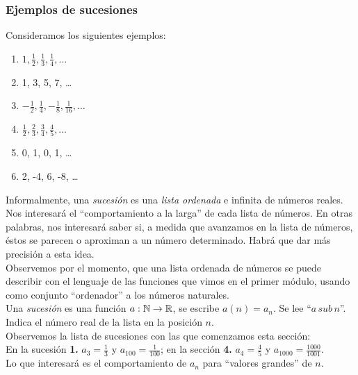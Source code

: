 \documentclass[../Teoría.root.tex]{subfiles}
\begin{document}
    \subsubsection{Ejemplos de sucesiones}
    Consideramos los siguientes ejemplos:
    \begin{enumerate}
        \item \(1,\frac{1}{2},\frac{1}{3},\frac{1}{4},\dots\)
        \item 1, 3, 5, 7, \dots
        \item \(-\frac{1}{2},\frac{1}{4},-\frac{1}{8},\frac{1}{16},\dots\)
        \item \(\frac{1}{2},\frac{2}{3},\frac{3}{4},\frac{4}{5},\dots\)
        \item 0, 1, 0, 1, \dots
        \item 2, -4, 6, -8, \dots
    \end{enumerate}
    Informalmente, una \textit{sucesión} es una \textit{lista ordenada} e infinita de números reales.\\
    Nos interesará el “comportamiento a la larga” de cada lista de números. En otras palabras, nos interesará saber si, a medida que avanzamos en la lista de números, éstos se parecen o aproximan a un número determinado. Habrá que dar más precisión a esta idea.\\
    Observemos por el momento, que una lista ordenada de números se puede describir con el lenguaje de las funciones que vimos en el primer módulo, usando como conjunto “ordenador” a los números naturales.\\
    Una \textit{sucesión} es una función \(a:\mathbb{N}\rightarrow\mathbb{R}\), se escribe \(a(n)=a_n\). Se lee “\(a\,sub\,n\)”. Indica el número real de la lista en la posición \(n\).\\
    Observemos la lista de sucesiones con las que comenzamos esta sección:\\
    En la sucesión \textbf{1.} \(a_3=\frac{1}{3}\) y \(a_{100}=\frac{1}{100}\); en la sección \textbf{4.} \(a_4=\frac{4}{5}\) y \(a_{1000}=\frac{1000}{1001}\).\\
    Lo que interesará es el comportamiento de \(a_n\) para “valores grandes” de \(n\).
\end{document}
